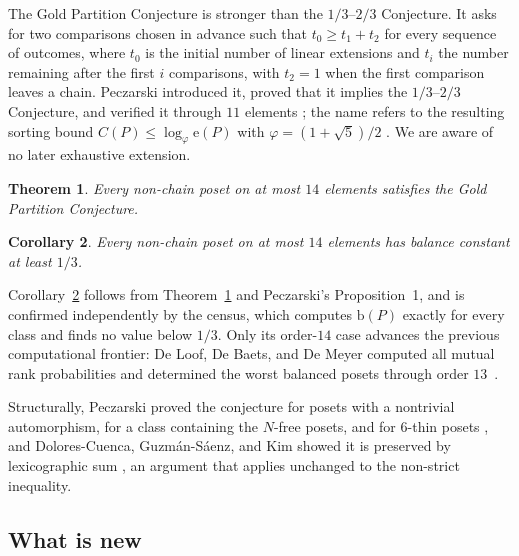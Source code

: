 \documentclass[11pt]{article}
\newtheorem{theorem}{Theorem}
\newtheorem{corollary}[theorem]{Corollary}
\theoremstyle{definition}
\newcommand{\ext}{\mathrm{e}}
\newcommand{\bal}{\mathrm{b}}
\begin{document}
The Gold Partition Conjecture is stronger than the $1/3$--$2/3$ Conjecture.
It asks for two comparisons chosen in advance such that $t_0\geq t_1+t_2$ for
every sequence of outcomes, where $t_0$ is the initial number of linear
extensions and $t_i$ the number remaining after the first $i$ comparisons,
with $t_2=1$ when the first comparison leaves a chain.  Peczarski introduced
it, proved that it implies the $1/3$--$2/3$ Conjecture, and verified it
through $11$ elements \cite[Conjecture~1, Proposition~1, and
Theorem~3]{peczarski-gold}; the name refers to the resulting sorting bound
$C(P)\leq\log_{\varphi}\ext(P)$ with $\varphi=(1+\sqrt5)/2$
\cite[Propositions~2--3]{peczarski-gold}.  We are aware of no later exhaustive
extension.

\begin{theorem}\label{thm:main}
Every non-chain poset on at most $14$ elements satisfies the Gold Partition
Conjecture.
\end{theorem}

\begin{corollary}\label{thm:third}
Every non-chain poset on at most $14$ elements has balance constant at least
$1/3$.
\end{corollary}

Corollary~\ref{thm:third} follows from Theorem~\ref{thm:main} and Peczarski's
Proposition~1, and is confirmed independently by the census, which computes
$\bal(P)$ exactly for every class and finds no value below $1/3$.  Only its
order-$14$ case advances the previous computational frontier: De Loof, De
Baets, and De Meyer computed all mutual rank probabilities and determined the
worst balanced posets through order $13$~\cite{deloof-census}.

Structurally, Peczarski proved the conjecture for posets with a nontrivial
automorphism, for a class containing the $N$-free posets, and for $6$-thin
posets \cite{peczarski-comments,peczarski-thin}, and Dolores-Cuenca,
Guzm\'an-S\'aenz, and Kim showed it is preserved by lexicographic sum
\cite[Lemma~2.5]{dolores-cuenca}, an argument that applies unchanged to the
non-strict inequality.

\subsection{What is new}
\end{document}
